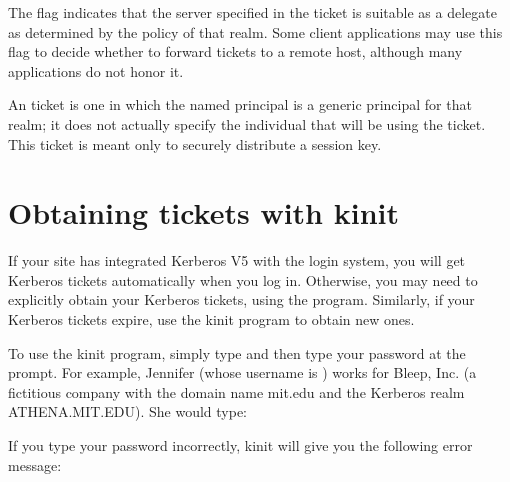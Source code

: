 \documentclass[letterpaper,10pt,english]{sphinxmanual}
\begin{document}
\sphinxAtStartPar
The  flag indicates that the server specified in
the ticket is suitable as a delegate as determined by the policy of
that realm.  Some client applications may use this flag to decide
whether to forward tickets to a remote host, although many
applications do not honor it.

\sphinxAtStartPar
An  ticket is one in which the named principal is a
generic principal for that realm; it does not actually specify the
individual that will be using the ticket.  This ticket is meant only
to securely distribute a session key.


\section{Obtaining tickets with kinit}
\label{\detokenize{user/tkt_mgmt:obtaining-tickets-with-kinit}}\label{\detokenize{user/tkt_mgmt:obtain-tkt}}
\sphinxAtStartPar
If your site has integrated Kerberos V5 with the login system, you
will get Kerberos tickets automatically when you log in.  Otherwise,
you may need to explicitly obtain your Kerberos tickets, using the
{\hyperref[\detokenize{user/user_commands/kinit:kinit-1}]{}} program.  Similarly, if your Kerberos tickets expire,
use the kinit program to obtain new ones.

\sphinxAtStartPar
To use the kinit program, simply type  and then type your
password at the prompt. For example, Jennifer (whose username is
) works for Bleep, Inc. (a fictitious company with the
domain name mit.edu and the Kerberos realm ATHENA.MIT.EDU).  She would
type:

\begin{sphinxVerbatim}[commandchars=\\\{\}]
 
    \PYG{p}{[} \PYG{l+s+s1}{s password here.]}
\end{sphinxVerbatim}

\sphinxAtStartPar
If you type your password incorrectly, kinit will give you the
following error message:

\begin{sphinxVerbatim}[commandchars=\\\{\}]
 
    \PYG{p}{[}    \PYG{p}{]}
  
\end{sphinxVerbatim}
\end{document}
